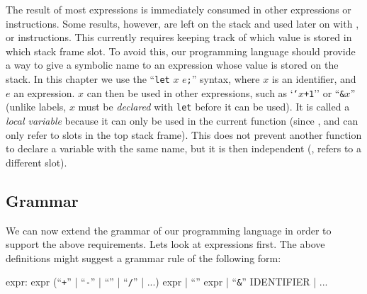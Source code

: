 The result of most expressions is immediately consumed in other expressions or
instructions. Some results, however, are left on the stack and used later on
with ,  or  instructions. This currently requires
keeping track of which value is stored in which stack frame slot. To avoid
this, our programming language should provide a way to give a symbolic name to
an expression whose value is stored on the stack. In this chapter we use the
``{\tt let} $x$ $e${\tt ;}'' syntax, where $x$ is an identifier, and $e$ an
expression. $x$ can then be used in other expressions, such as `{\tt `$x$+1}''
or ``{\tt \&$x$}'' (unlike labels, $x$ must be {\em declared} with {\tt let}
before it can be used). It is called a {\em local variable} because it can only
be used in the current function (since ,  and 
can only refer to slots in the top stack frame). This does not prevent another
function to declare a variable with the same name, but it is then independent
(\ie, refers to a different slot).

\subsection{Grammar}

We can now extend the grammar of our programming language in order to support
the above requirements. Lets look at expressions first. The above definitions
might suggest a grammar rule of the following form:

\begin{Paragraph}
expr: expr (``{\tt +}'' | ``{\tt -}'' | ``{\tt *}'' | ``{\tt /}'' | ...) expr |
``{\tt *}'' expr | ``{\tt \&}'' IDENTIFIER | ...
\end{Paragraph}


